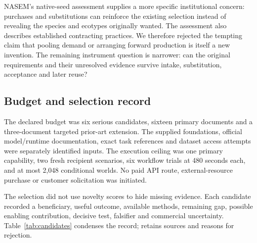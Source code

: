\documentclass[11pt]{article}
\begin{document}
NASEM's native-seed assessment supplies a more specific institutional concern: purchases and substitutions can reinforce the existing selection instead of revealing the species and ecotypes originally wanted. The assessment also describes established contracting practices. We therefore rejected the tempting claim that pooling demand or arranging forward production is itself a new invention. The remaining instrument question is narrower: can the original requirements and their unresolved evidence survive intake, substitution, acceptance and later reuse?\cite{nasem}

\subsection{Budget and selection record}
 The declared budget was six serious candidates, sixteen primary documents and a three-document targeted prior-art extension. The supplied foundations, official model/runtime documentation, exact task references and dataset access attempts were separately identified inputs. The execution ceiling was one primary capability, two fresh recipient scenarios, six workflow trials at 480 seconds each, and at most 2,048 conditional worlds. No paid API route, external-resource purchase or customer solicitation was initiated.

The selection did not use novelty scores to hide missing evidence. Each candidate recorded a beneficiary, useful outcome, available methods, remaining gap, possible enabling contribution, decisive test, falsifier and commercial uncertainty. Table~\ref{tab:candidates} condenses the record;  retains sources and reasons for rejection.
\end{document}
